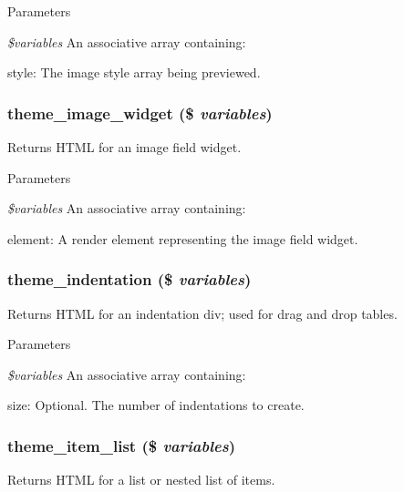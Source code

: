 \begin{DoxyParams}{Parameters}
\item[{\em \$variables}]An associative array containing:
\begin{DoxyItemize}
\item style: The image style array being previewed. 
\end{DoxyItemize}\end{DoxyParams}
\hypertarget{group__themeable_ga455134ab57ea615adf71aaa27adf9e75}{
\subsubsection[{theme\_\-image\_\-widget}]{\setlength{\rightskip}{0pt plus 5cm}theme\_\-image\_\-widget (\$ {\em variables})}}
\label{group__themeable_ga455134ab57ea615adf71aaa27adf9e75}
Returns HTML for an image field widget.


\begin{DoxyParams}{Parameters}
\item[{\em \$variables}]An associative array containing:
\begin{DoxyItemize}
\item element: A render element representing the image field widget. 
\end{DoxyItemize}\end{DoxyParams}
\hypertarget{group__themeable_ga045159ba9e2be46a91a8883328963b2c}{
\subsubsection[{theme\_\-indentation}]{\setlength{\rightskip}{0pt plus 5cm}theme\_\-indentation (\$ {\em variables})}}
\label{group__themeable_ga045159ba9e2be46a91a8883328963b2c}
Returns HTML for an indentation div; used for drag and drop tables.


\begin{DoxyParams}{Parameters}
\item[{\em \$variables}]An associative array containing:
\begin{DoxyItemize}
\item size: Optional. The number of indentations to create. 
\end{DoxyItemize}\end{DoxyParams}
\hypertarget{group__themeable_ga515afdc4832483a813cd09ba4786fdfe}{
\subsubsection[{theme\_\-item\_\-list}]{\setlength{\rightskip}{0pt plus 5cm}theme\_\-item\_\-list (\$ {\em variables})}}
\label{group__themeable_ga515afdc4832483a813cd09ba4786fdfe}
Returns HTML for a list or nested list of items.


